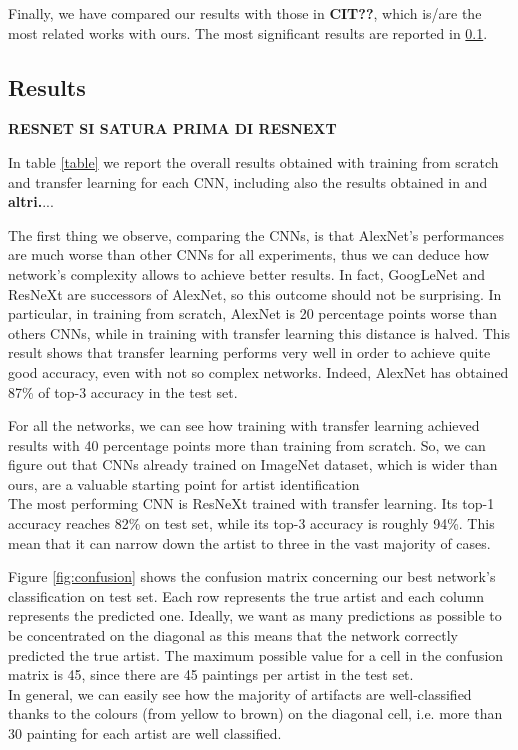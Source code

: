 \documentclass{article}
\begin{document}
Finally, we have compared our results with those in \textbf{CIT??}, which is/are the most related works with ours. 
The most significant results are reported in \ref{results}.

\subsection{Results}\label{results}

\textbf{RESNET SI SATURA PRIMA DI RESNEXT}

In table \ref{table} we report the overall results obtained with training  from scratch and transfer learning for each CNN, including also the results obtained in \cite{ArtistIdCNN406} and \textbf{altri.}...

The first thing we observe, comparing the CNNs, is that AlexNet's performances are much worse than other CNNs for all experiments, thus we can deduce how network's complexity allows to achieve better results. In fact, GoogLeNet and ResNeXt are successors of AlexNet, so this outcome should not be surprising. 
In particular, in training from scratch, AlexNet is 20 percentage points worse than others CNNs, while in training with transfer learning this distance is halved. This result shows that transfer learning performs very well in order to achieve quite good accuracy, even with not so complex networks. Indeed, AlexNet has obtained 87\% of top-3 accuracy in the test set.

For all the networks, we can see how training with transfer learning achieved results with 40 percentage points more than training from scratch. So, we can figure out that CNNs already trained on ImageNet dataset, which is wider than ours,  are a valuable starting point for artist identification\\
The most performing CNN is ResNeXt trained with transfer learning. Its top-1 accuracy reaches 82\% on test set, while its top-3 accuracy is roughly 94\%. This mean that it can narrow down the artist to three in the vast majority of cases.

Figure \ref{fig:confusion} shows the confusion matrix concerning our best network's classification on test set. Each row represents the true artist and each column represents the predicted one. Ideally, we want as many predictions as possible to be concentrated on the diagonal as this means that the network correctly predicted the true artist. The maximum possible value for a cell in the confusion matrix is 45, since there are 45 paintings per artist in the test set.\\
In general, we can easily see how the majority of artifacts are well-classified thanks to the colours (from yellow to brown) on the diagonal cell, i.e. more than 30 painting for each artist are well classified.
\end{document}
